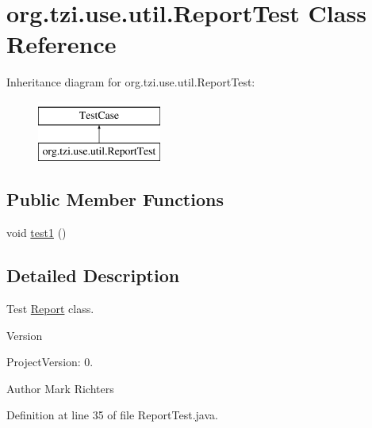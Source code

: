 \hypertarget{classorg_1_1tzi_1_1use_1_1util_1_1_report_test}{\section{org.\-tzi.\-use.\-util.\-Report\-Test Class Reference}
\label{classorg_1_1tzi_1_1use_1_1util_1_1_report_test}
}
Inheritance diagram for org.\-tzi.\-use.\-util.\-Report\-Test\-:\begin{figure}[H]
\begin{center}
\leavevmode
\includegraphics[height=2.000000cm]{classorg_1_1tzi_1_1use_1_1util_1_1_report_test}
\end{center}
\end{figure}
\subsection*{Public Member Functions}
\begin{DoxyCompactItemize}
\item 
void \hyperlink{classorg_1_1tzi_1_1use_1_1util_1_1_report_test_ac9b03f03092933e0e38d67d95214f075}{test1} ()
\end{DoxyCompactItemize}


\subsection{Detailed Description}
Test \hyperlink{classorg_1_1tzi_1_1use_1_1util_1_1_report}{Report} class.

\begin{DoxyVersion}{Version}

\end{DoxyVersion}
\begin{DoxyParagraph}{Project\-Version\-:}
0. 
\end{DoxyParagraph}
\begin{DoxyAuthor}{Author}
Mark Richters 
\end{DoxyAuthor}


Definition at line 35 of file Report\-Test.\-java.



